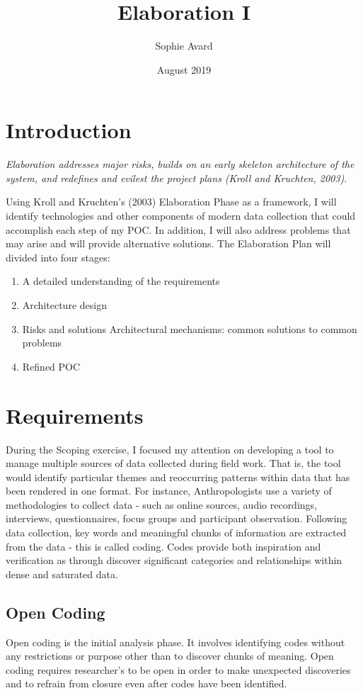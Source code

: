 \documentclass{article}
\title{Elaboration I}
\author{Sophie Avard }
\date{August 2019}
\begin{document}
\maketitle

\tableofcontents
\pagebreak

\section{Introduction}
\begin{center}
\textit{Elaboration addresses major risks, builds on an early skeleton architecture of the system, and redefines and evilest the project plans (Kroll and Kruchten, 2003)}.
\end{center}

Using Kroll and Kruchten’s (2003) Elaboration Phase as a framework, I will identify technologies and other components of modern data collection that could accomplish each step of my POC. In addition, I will also address problems that may arise and will provide alternative solutions. The Elaboration Plan will divided into four stages:
\begin{enumerate}
    \item A detailed understanding of the requirements
    \item Architecture design 
    \item Risks and solutions
    \subitem Architectural mechanisms: common solutions to common problems 
    \item Refined POC
\end{enumerate}

\section{Requirements}
During the Scoping exercise, I focused my attention on developing a tool to manage multiple sources of data collected during field work. That is, the tool would identify particular themes and reoccurring patterns within data that has been rendered in one format. For instance, Anthropologists use a variety of methodologies to collect data - such as online sources, audio recordings, interviews, questionnaires, focus groups and participant observation. Following data collection, key words and meaningful chunks of information are extracted from the data - this is called coding. Codes provide both inspiration and verification as through discover significant categories and relationships within dense and saturated data. 

\subsection{Open Coding}
Open coding is the initial analysis phase. It involves identifying codes without any restrictions or purpose other than to discover chunks of meaning. Open coding requires researcher's to be open in order to make unexpected discoveries and to refrain from closure even after codes have been identified. 
\end{document}
